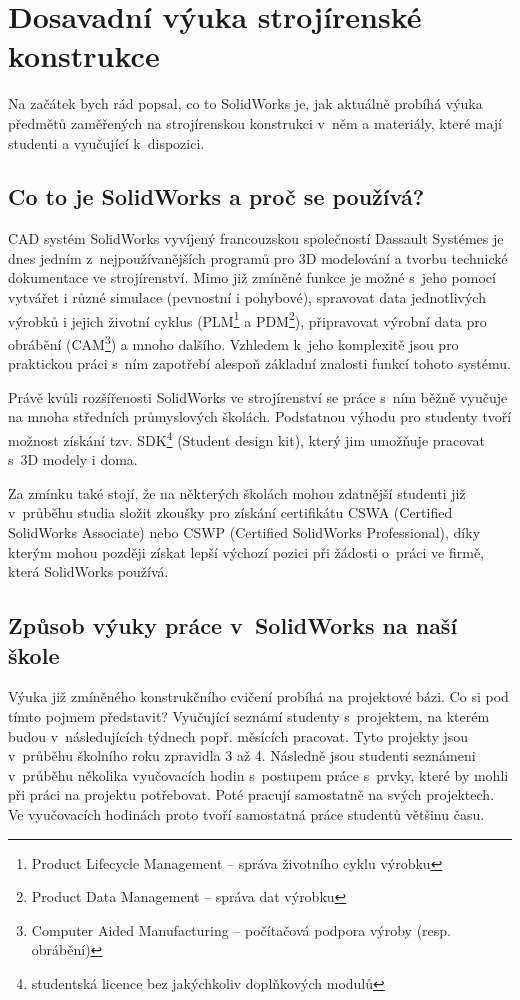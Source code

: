\chapter{Dosavadní výuka strojírenské konstrukce}
Na začátek bych rád popsal, co to SolidWorks je, jak aktuálně probíhá výuka předmětů zaměřených na strojírenskou konstrukci v~něm a materiály, které mají studenti a vyučující k~dispozici.

\section{Co to je SolidWorks a proč se používá?}
    CAD systém SolidWorks vyvíjený francouzskou společností Dassault Systémes je dnes jedním z~nejpoužívanějších programů pro 3D modelování a tvorbu technické dokumentace ve strojírenství.
    Mimo již zmíněné funkce je možné s~jeho pomocí vytvářet i různé simulace (pevnostní i pohybové), spravovat data jednotlivých výrobků i jejich životní cyklus (PLM\footnote{Product Lifecycle Management -- správa životního cyklu výrobku} a PDM\footnote{Product Data Management -- správa dat výrobku}), připravovat výrobní data pro obrábění (CAM\footnote{Computer Aided Manufacturing -- počítačová podpora výroby (resp. obrábění)}) a mnoho dalšího.
    Vzhledem k~jeho komplexitě jsou pro praktickou práci s~ním zapotřebí alespoň základní znalosti funkcí tohoto systému.

    Právě kvůli rozšířenosti SolidWorks ve strojírenství se práce s~ním běžně vyučuje na mnoha středních průmyslových školách.
    Podstatnou výhodu pro studenty tvoří možnost získání tzv. SDK\footnote{studentská licence bez jakýchkoliv doplňkových modulů} (Student design kit), který jim umožňuje pracovat s~3D modely i doma.

    Za zmínku také stojí, že na některých školách mohou zdatnější studenti již v~průběhu studia složit zkoušky pro získání certifikátu CSWA (Certified SolidWorks Associate) nebo CSWP (Certified SolidWorks Professional), díky kterým mohou později získat lepší výchozí pozici při žádosti o~práci ve firmě, která SolidWorks používá.

\section{Způsob výuky práce v~SolidWorks na naší škole}
    Výuka již zmíněného konstrukčního cvičení probíhá na projektové bázi.
    Co si pod tímto pojmem představit?
    Vyučující seznámí studenty s~projektem, na kterém budou v~následujících týdnech popř. měsících pracovat. 
    Tyto projekty jsou v~průběhu školního roku zpravidla 3 až 4.
    Následně jsou studenti seznámeni v~průběhu několika vyučovacích hodin s~postupem práce s~prvky, které by mohli při práci na projektu potřebovat.
    Poté pracují samostatně na svých projektech.
    Ve vyučovacích hodinách proto tvoří samostatná práce studentů většinu času.

